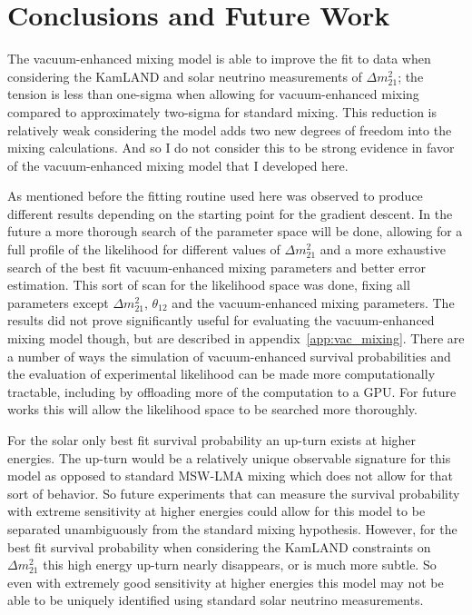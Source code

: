 \section{Conclusions and Future Work}
The vacuum-enhanced mixing model is able to improve the fit to data when
considering the KamLAND and solar neutrino measurements of $\Delta m^{2}_{21}$;
the tension is less than one-sigma when allowing for vacuum-enhanced mixing compared
to approximately two-sigma for standard mixing.
This reduction is relatively weak considering the model adds two new degrees
of freedom into the mixing calculations.
And so I do not consider this to be strong evidence in favor of the vacuum-enhanced
mixing model that I developed here.

As mentioned before the fitting routine used here was observed to produce different results
depending on the starting point for the gradient descent.
In the future a more thorough search of the parameter space will be done, allowing
for a full profile of the likelihood for different values of $\Delta m^{2}_{21}$ and
a more exhaustive search of the best fit vacuum-enhanced mixing parameters and better
error estimation.
This sort of scan for the likelihood space was done, fixing all parameters
except $\Delta m^{2}_{21}$, $\theta_{12}$ and the vacuum-enhanced mixing parameters.
The results did not prove significantly useful for evaluating
the vacuum-enhanced mixing model though, but are described in appendix~\ref{app:vac_mixing}.
There are a number of ways the simulation of vacuum-enhanced survival
probabilities and the evaluation of experimental likelihood can be made more 
computationally tractable, including by offloading more of the computation
to a GPU.
For future works this will allow the likelihood space to be searched more thoroughly.

For the solar only best fit survival probability an up-turn exists at
higher energies.
The up-turn would be a relatively unique observable signature for this model as opposed to
standard MSW-LMA mixing which does not allow for that sort of behavior.
So future experiments that can measure the survival probability with extreme
sensitivity at higher energies could allow for this model to be separated unambiguously
from the standard mixing hypothesis.
However, for the best fit survival probability when considering the KamLAND constraints
on $\Delta m^{2}_{21}$ this high energy up-turn nearly disappears, or is much more subtle.
So even with extremely good sensitivity at higher energies this model may not be able
to be uniquely identified using standard solar neutrino measurements.

